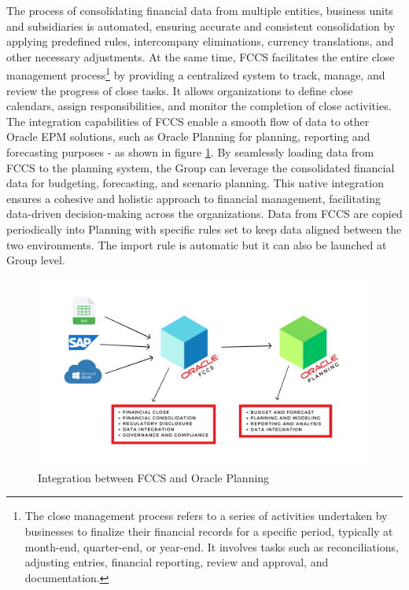 \documentclass[12pt,a4paper,openright,twoside]{book}
\begin{document}
The process of consolidating financial data from multiple entities, business units and subsidiaries is automated, ensuring accurate and consistent consolidation by applying predefined rules, intercompany eliminations, currency translations, and other necessary adjustments.
%
At the same time, FCCS facilitates the entire close management process\footnote{The close management process refers to a series of activities undertaken by businesses to finalize their financial records for a specific period, typically at month-end, quarter-end, or year-end. It involves tasks such as reconciliations, adjusting entries, financial reporting, review and approval, and documentation.} by providing a centralized system to track, manage, and review the progress of close tasks. 
%
It allows organizations to define close calendars, assign responsibilities, and monitor the completion of close activities.
%
The integration capabilities of FCCS enable a smooth flow of data to other Oracle EPM solutions, such as Oracle Planning for planning, reporting and forecasting purposes - as shown in figure \ref{fig:planning-fccs}.
%
By seamlessly loading data from FCCS to the planning system, the Group can leverage the consolidated financial data for budgeting, forecasting, and scenario planning. 
%
This native integration ensures a cohesive and holistic approach to financial management, facilitating data-driven decision-making across the organizations.
%
Data from FCCS are copied periodically into Planning with specific rules set to keep data aligned between the two environments.
%
The import rule is automatic but it can also be launched at Group level. 

\begin{figure}[htbp]
	\centering
	\includegraphics[width=\linewidth]{figures/planning-fccs.pdf}
	\caption{Integration between FCCS and Oracle Planning}
	\label{fig:planning-fccs}
\end{figure}
\end{document}
